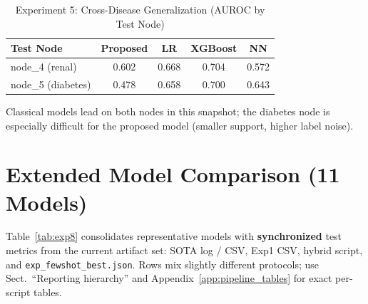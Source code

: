 \begin{table}[htbp]
\centering
\caption{Experiment 5: Cross-Disease Generalization (AUROC by Test Node)}
\small
\begin{tabular}{lcccc}
\toprule
Test Node & Proposed & LR & XGBoost & NN \\
\midrule
node\_4 (renal) & 0.602 & 0.668 & 0.704 & 0.572 \\
node\_5 (diabetes) & 0.478 & 0.658 & 0.700 & 0.643 \\
\bottomrule
\end{tabular}
\label{tab:exp5}
\end{table}

\noindent Classical models lead on both nodes in this snapshot; the diabetes node is especially difficult for the proposed model (smaller support, higher label noise).

\section{Extended Model Comparison (11 Models)}

Table~\ref{tab:exp8} consolidates representative models with \textbf{synchronized} test metrics from the current artifact set: SOTA log / CSV, Exp1 CSV, hybrid script, and \texttt{exp\_fewshot\_best.json}. Rows mix slightly different protocols; use Sect.~``Reporting hierarchy'' and Appendix~\ref{app:pipeline_tables} for exact per-script tables.

